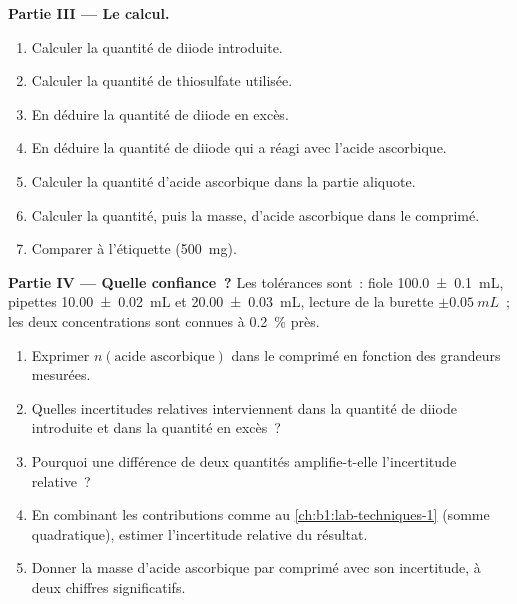 \begin{problem}
\medskip
\noindent\textbf{Partie III --- Le calcul.}
\begin{enumerate}[resume]
  \item Calculer la quantité de diiode introduite.
  \item Calculer la quantité de thiosulfate utilisée.
  \item En déduire la quantité de diiode en excès.
  \item En déduire la quantité de diiode qui a réagi avec l'acide
        ascorbique.
  \item Calculer la quantité d'acide ascorbique dans la partie aliquote.
  \item Calculer la quantité, puis la masse, d'acide ascorbique dans le
        comprimé.
  \item Comparer à l'étiquette (\qty{500}{mg}).
\end{enumerate}

\medskip
\noindent\textbf{Partie IV --- Quelle confiance~?}
Les tolérances sont~: fiole \qty{100.0 \pm 0.1}{mL}, pipettes
\qty{10.00 \pm 0.02}{mL} et \qty{20.00 \pm 0.03}{mL}, lecture de la
burette $\pm\qty{0.05}{mL}$~; les deux concentrations sont connues à
\qty{0.2}{\percent} près.
\begin{enumerate}[resume]
  \item Exprimer $n(\text{acide ascorbique})$ dans le comprimé en
        fonction des grandeurs mesurées.
  \item Quelles incertitudes relatives interviennent dans la quantité de
        diiode introduite et dans la quantité en excès~?
  \item Pourquoi une différence de deux quantités amplifie-t-elle
        l'incertitude relative~?
  \item En combinant les contributions comme au
        \cref{ch:b1:lab-techniques-1} (somme quadratique), estimer
        l'incertitude relative du résultat.
  \item Donner la masse d'acide ascorbique par comprimé avec son
        incertitude, à deux chiffres significatifs.
\end{enumerate}
\end{problem}
